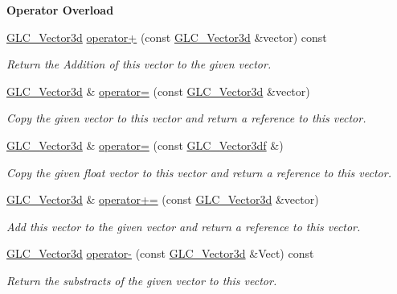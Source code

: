 \begin{Indent}{\bf Operator Overload}\par
\begin{DoxyCompactItemize}
\item 
\hyperlink{class_g_l_c___vector3d}{G\-L\-C\-\_\-\-Vector3d} \hyperlink{class_g_l_c___vector3d_a7175b365e206afa73f77cd38929d0c3e}{operator+} (const \hyperlink{class_g_l_c___vector3d}{G\-L\-C\-\_\-\-Vector3d} \&vector) const 
\begin{DoxyCompactList}\small\item\em Return the Addition of this vector to the given vector. \end{DoxyCompactList}\item 
\hyperlink{class_g_l_c___vector3d}{G\-L\-C\-\_\-\-Vector3d} \& \hyperlink{class_g_l_c___vector3d_ac9cdc13304a7ffa3a536f33a12fc3f96}{operator=} (const \hyperlink{class_g_l_c___vector3d}{G\-L\-C\-\_\-\-Vector3d} \&vector)
\begin{DoxyCompactList}\small\item\em Copy the given vector to this vector and return a reference to this vector. \end{DoxyCompactList}\item 
\hyperlink{class_g_l_c___vector3d}{G\-L\-C\-\_\-\-Vector3d} \& \hyperlink{class_g_l_c___vector3d_ab78463e70af4c9cb36366b95f6b6dc39}{operator=} (const \hyperlink{class_g_l_c___vector3df}{G\-L\-C\-\_\-\-Vector3df} \&)
\begin{DoxyCompactList}\small\item\em Copy the given float vector to this vector and return a reference to this vector. \end{DoxyCompactList}\item 
\hyperlink{class_g_l_c___vector3d}{G\-L\-C\-\_\-\-Vector3d} \& \hyperlink{class_g_l_c___vector3d_a73d959bd277549302c2c25a9fda6cffd}{operator+=} (const \hyperlink{class_g_l_c___vector3d}{G\-L\-C\-\_\-\-Vector3d} \&vector)
\begin{DoxyCompactList}\small\item\em Add this vector to the given vector and return a reference to this vector. \end{DoxyCompactList}\item 
\hyperlink{class_g_l_c___vector3d}{G\-L\-C\-\_\-\-Vector3d} \hyperlink{class_g_l_c___vector3d_ad7a09f6114efd7cad8b6a7e62678c117}{operator-\/} (const \hyperlink{class_g_l_c___vector3d}{G\-L\-C\-\_\-\-Vector3d} \&Vect) const 
\begin{DoxyCompactList}\small\item\em Return the substracts of the given vector to this vector. \end{DoxyCompactList}\item 

\end{DoxyCompactItemize}
\end{Indent}
